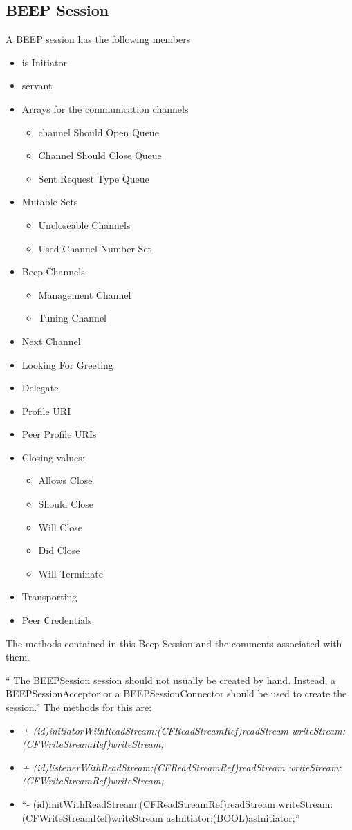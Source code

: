 \subsection {BEEP Session}
A BEEP session has the following members
\begin{itemize}
\item is Initiator
\item servant 
\item Arrays for the communication channels
\begin{itemize}
\item channel Should Open Queue
\item Channel Should Close Queue
\item Sent Request Type Queue
\end{itemize}
\item Mutable Sets
\begin{itemize}
\item Uncloseable Channels
\item Used Channel Number Set
\end{itemize}
\item Beep Channels
\begin{itemize}
\item Management Channel
\item Tuning Channel
\end{itemize}
\item Next Channel
\item Looking For Greeting
\item Delegate
\item Profile URI
\item Peer Profile URIs
\item Closing values:
\begin{itemize}
\item  Allows Close
\item Should Close
\item Will Close
\item Did Close
\item Will Terminate
\end{itemize}
\item Transporting
\item Peer Credentials
\end{itemize}


The methods contained in this Beep Session and the comments associated with them.  

`` The BEEPSession session should not usually be created by hand.  Instead, a BEEPSessionAcceptor
 or a BEEPSessionConnector should be used to create the session.''  The methods for this are:
 \begin{itemize}
\item \textsl{+ (id)initiatorWithReadStream:(CFReadStreamRef)readStream writeStream:(CFWriteStreamRef)writeStream;}
\item \textsl{+ (id)listenerWithReadStream:(CFReadStreamRef)readStream writeStream:(CFWriteStreamRef)writeStream;}
\item ``- (id)initWithReadStream:(CFReadStreamRef)readStream writeStream:(CFWriteStreamRef)writeStream asInitiator:(BOOL)asInitiator;''
\end{itemize}
 
